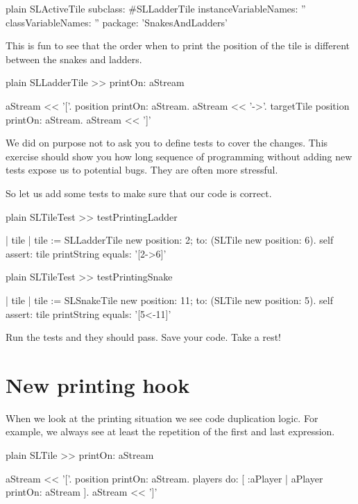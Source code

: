 \documentclass[10pt,twoside,english]{_support/latex/sbabook/sbabook}
\begin{document}
\begin{displaycode}{plain}
SLActiveTile subclass: #SLLadderTile
	instanceVariableNames: ''
	classVariableNames: ''
	package: 'SnakesAndLadders'
\end{displaycode}

This is fun to see that the order when to print the position of the tile is different between the snakes and ladders.

\begin{displaycode}{plain}
SLLadderTile >> printOn: aStream

	aStream << '['.
	position printOn: aStream.
	aStream << '->'.
	targetTile position printOn: aStream.
	aStream << ']'
\end{displaycode}

We did on purpose not to ask you to define tests to cover the changes. This exercise should show you how long sequence of programming without adding new tests expose us to 
potential bugs. They are often more stressful.

So let us add some tests to make sure that our code is correct.

\begin{displaycode}{plain}
SLTileTest >> testPrintingLadder

	| tile |
	tile := SLLadderTile new position: 2; to: (SLTile new position: 6). 
	self assert: tile printString equals: '[2->6]'
\end{displaycode}

\begin{displaycode}{plain}
SLTileTest >> testPrintingSnake

	| tile |
	tile := SLSnakeTile new position: 11; to: (SLTile new position: 5). 
	self assert: tile printString equals: '[5<-11]'
\end{displaycode}

Run the tests and they should pass. Save your code. Take a rest!
\section{New printing hook}
When we look at the printing situation we see code duplication logic.
For example, we always see at least the repetition of the first and last expression.

\begin{displaycode}{plain}
SLTile >> printOn: aStream

	aStream << '['.
	position printOn: aStream.
	players do: [ :aPlayer | aPlayer printOn: aStream ].
	aStream << ']'
\end{displaycode}
\end{document}
